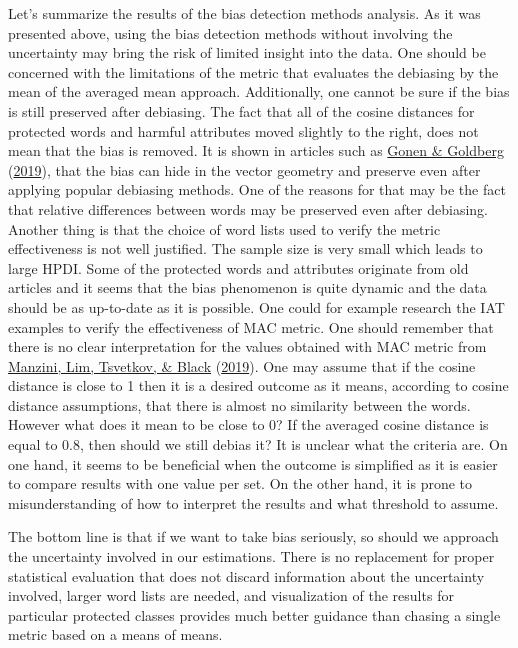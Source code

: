 \documentclass[
  12pt,
]{book}
\begin{document}
Let's summarize the results of the bias detection methods analysis. As it was presented above, using the bias detection methods without involving the uncertainty may bring the risk of limited insight into the data. One should be concerned with the limitations of the metric that evaluates the debiasing by the mean of the averaged mean approach. Additionally, one cannot be sure if the bias is still preserved after debiasing. The fact that all of the cosine distances for protected words and harmful attributes moved slightly to the right, does not mean that the bias is removed. It is shown in articles such as \protect\hyperlink{ref-Gonen2019Lipstick}{Gonen \& Goldberg} (\protect\hyperlink{ref-Gonen2019Lipstick}{2019}), that the bias can hide in the vector geometry and preserve even after applying popular debiasing methods. One of the reasons for that may be the fact that relative differences between words may be preserved even after debiasing. Another thing is that the choice of word lists used to verify the metric effectiveness is not well justified. The sample size is very small which leads to large HPDI. Some of the protected words and attributes originate from old articles and it seems that the bias phenomenon is quite dynamic and the data should be as up-to-date as it is possible. One could for example research the IAT examples to verify the effectiveness of MAC metric. One should remember that there is no clear interpretation for the values obtained with MAC metric from \protect\hyperlink{ref-Manzini2019blackToCriminal}{Manzini, Lim, Tsvetkov, \& Black} (\protect\hyperlink{ref-Manzini2019blackToCriminal}{2019}). One may assume that if the cosine distance is close to 1 then it is a desired outcome as it means, according to cosine distance assumptions, that there is almost no similarity between the words. However what does it mean to be close to 0? If the averaged cosine distance is equal to 0.8, then should we still debias it? It is unclear what the criteria are. On one hand, it seems to be beneficial when the outcome is simplified as it is easier to compare results with one value per set. On the other hand, it is prone to misunderstanding of how to interpret the results and what threshold to assume.

The bottom line is that if we want to take bias seriously, so should we approach the uncertainty involved in our estimations. There is no replacement for proper statistical evaluation that does not discard information about the uncertainty involved, larger word lists are needed, and visualization of the results for particular protected classes provides much better guidance than chasing a single metric based on a means of means.
\end{document}
